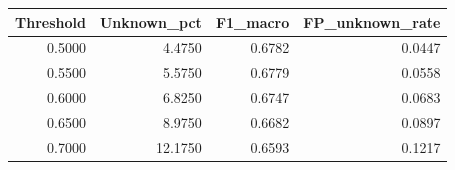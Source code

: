 \begin{tabular}{rrrr}
\toprule
Threshold & Unknown_pct & F1_macro & FP_unknown_rate \\
\midrule
0.5000 & 4.4750 & 0.6782 & 0.0447 \\
0.5500 & 5.5750 & 0.6779 & 0.0558 \\
0.6000 & 6.8250 & 0.6747 & 0.0683 \\
0.6500 & 8.9750 & 0.6682 & 0.0897 \\
0.7000 & 12.1750 & 0.6593 & 0.1217 \\
\bottomrule
\end{tabular}
